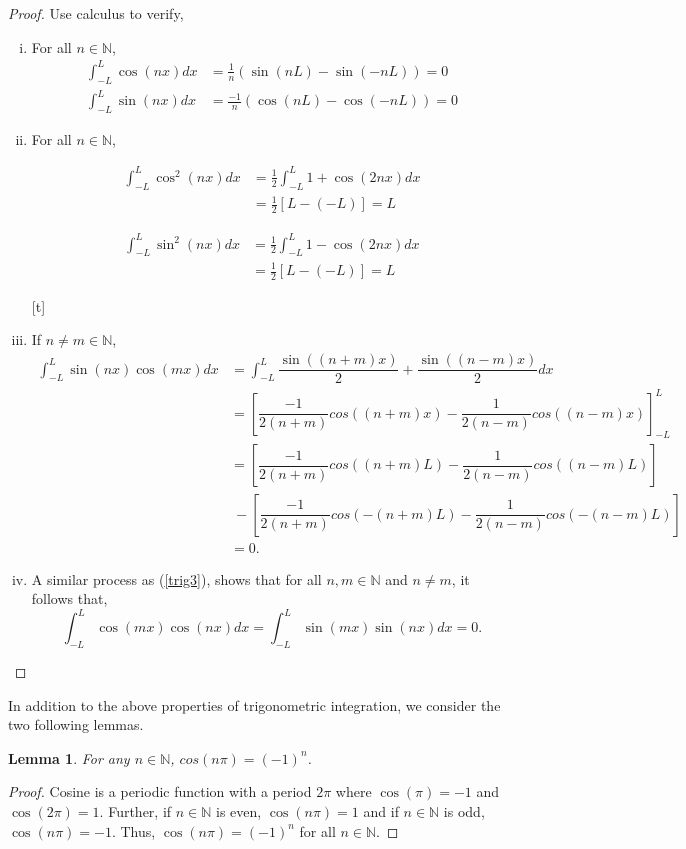 \documentclass[11pt]{amsart}
\theoremstyle{plain}
\newtheorem{lemma}[theorem]{Lemma}
\theoremstyle{definition}
\newcommand{\N}{\mathbb N}
\begin{document}
\begin{proof} Use calculus to verify,
    \begin{enumerate}[(i)]
    \setlength\itemsep{1em}
        \item For all $n\in \N$, \begin{align*}
            \int_{-L}^L \cos(nx)dx &= \frac{1}{n}(\sin(nL)-\sin(-nL)) = 0 \\
            \int_{-L}^L \sin(nx)dx &= \frac{-1}{n}(\cos(nL)-\cos(-nL)) = 0 \end{align*}
        \item For all $n\in \N$, \\
        \begin{minipage}{0.5\textwidth}
            \begin{align*}
                \int_{-L}^L \cos^2(nx)dx &= \frac{1}{2}\int_{-L}^L 1+ \cos(2nx)dx \\
                &= \frac{1}{2} \left[ L -(-L) \right] = L
            \end{align*}
        \end{minipage}
        \begin{minipage}{0.5\textwidth}
        \begin{align*}
            \int_{-L}^L \sin^2(nx)dx &= \frac{1}{2}\int_{-L}^L 1- \cos(2nx)dx \\
            &= \frac{1}{2} \left[ L -(-L) \right] = L 
        \end{align*}
        \end{minipage}[t]
        \item If $n\neq m \in \N$,
        \begin{align*}
            \int_{-L}^{L} \sin(nx)\cos(mx)dx &= \int_{-L}^{L} \dfrac{\sin((n+m)x)}{2} + \dfrac{\sin((n-m)x)}{2}dx\\
            &= \left[\dfrac{-1}{2(n+m)}cos((n+m)x)-\dfrac{1}{2(n-m)}cos((n-m)x)\right]_{-L}^L\\
            &= \left[\dfrac{-1}{2(n+m)}cos((n+m)L)-\dfrac{1}{2(n-m)}cos((n-m)L)\right]\\
            &\ -\left[\dfrac{-1}{2(n+m)}cos(-(n+m)L)-\dfrac{1}{2(n-m)}cos(-(n-m)L)\right]\\
            &= 0.
        \end{align*}
        \item A similar process as (\ref{trig3}), shows that for all $n,m\in \N$ and $n\neq m$, it follows that, $$\int_{-L}^{L} \cos(mx)\cos(nx)dx =\int_{-L}^{L} \sin(mx)\sin(nx)dx  = 0.$$
    \end{enumerate}
\end{proof}
In addition to the above properties of trigonometric integration, we consider the two following lemmas. 
\begin{lemma} \label{lem:trig1}
    For any $n\in\N$, $cos(n\pi) = (-1)^n$.
\end{lemma}
\begin{proof}
    Cosine is a periodic function with a period $2\pi$ where $\cos(\pi) = -1$ and $\cos(2\pi)= 1$. Further, if $n \in \N$ is even, $\cos(n\pi)= 1$ and if $n \in \N$ is odd, $\cos(n\pi) = -1.$ Thus, $\cos(n\pi) = (-1)^n$ for all $n\in\N.$
\end{proof}
\end{document}
